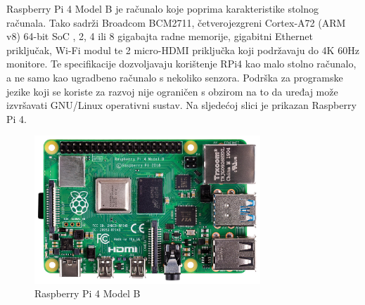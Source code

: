 \documentclass[times, utf8, diplomski]{fer}
\begin{document}
Raspberry Pi 4 Model B\citep{RPi4} je računalo koje poprima karakteristike stolnog računala. Tako sadrži Broadcom BCM2711, četverojezgreni Cortex-A72 (ARM v8) 64-bit SoC , 2, 4 ili 8 gigabajta radne memorije, gigabitni Ethernet priključak, Wi-Fi modul te 2 micro-HDMI priključka koji podržavaju do 4K 60Hz monitore. Te specifikacije dozvoljavaju korištenje RPi4 kao malo stolno računalo, a ne samo kao ugradbeno računalo s nekoliko senzora. Podrška za programske jezike koji se koriste za razvoj nije ograničen s obzirom na to da uređaj može izvršavati GNU/Linux operativni sustav. Na sljedećoj slici je prikazan Raspberry Pi 4.
\begin{figure}[htb]
    \centering
    \includegraphics[width=8.5cm]{images/rpi4.jpg}
    \caption{Raspberry Pi 4 Model B\citep{RPi4Img}}
    \label{fig:rpi4}
\end{figure}
\end{document}
